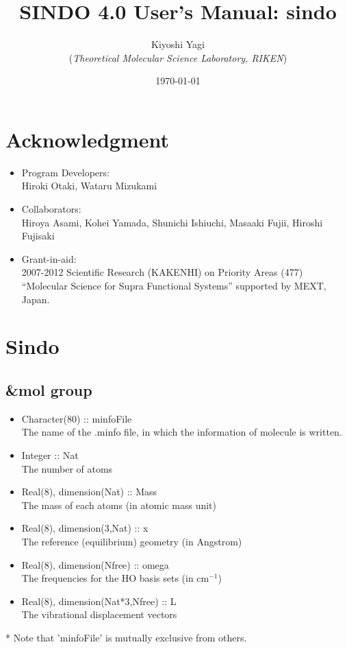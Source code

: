 \documentclass[a4paper,12pt]{article}
\title{{\huge S{\LARGE INDO} 4.0 User's Manual: sindo} }
\author{Kiyoshi Yagi \\ ({\it Theoretical Molecular Science Laboratory, RIKEN})}
\date{\today}
\begin{document}
\maketitle

\newpage
\tableofcontents

\newpage

\section*{Acknowledgment}

\begin{itemize}
  \item Program Developers: \\
	Hiroki Otaki, Wataru Mizukami

  \item Collaborators: \\
	Hiroya Asami, Kohei Yamada, Shunichi Ishiuchi, Masaaki Fujii, Hiroshi Fujisaki

  \item Grant-in-aid: \\
	2007-2012 Scientific Research (KAKENHI) on Priority Areas (477)  ``Molecular Science for Supra Functional Systems'' supported by MEXT, Japan.	
  
\end{itemize}

\newpage

\section{Sindo}
\subsection{\&mol group}
   \begin{itemize}
     \item Character(80) :: minfoFile \\
       The name of the .minfo file, in which the information of molecule is written.
     \item Integer :: Nat \\
       The number of atoms
     \item Real(8), dimension(Nat) :: Mass \\
       The mass of each atoms (in atomic mass unit)
     \item Real(8), dimension(3,Nat) :: x \\
       The reference (equilibrium) geometry (in Angstrom)
     \item Real(8), dimension(Nfree) :: omega \\
       The frequencies for the HO basis sets (in $\mathrm{cm^{-1}}$) 
     \item Real(8), dimension(Nat*3,Nfree) :: L \\
       The vibrational displacement vectors 
   \end{itemize}
* Note that 'minfoFile' is mutually exclusive from others. 
\end{document}
